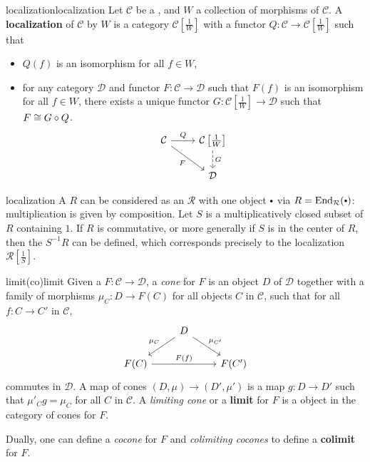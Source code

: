 \begin{topic}{localization}{localization}
    Let $\mathcal{C}$ be a , and $W$ a collection of morphisms of $\mathcal{C}$. A \textbf{localization} of $\mathcal{C}$ by $W$ is a category $\mathcal{C}\left[\frac{1}{W}\right]$ with a functor $Q \colon \mathcal{C} \to \mathcal{C}\left[\frac{1}{W}\right]$ such that
    \begin{itemize}
        \item $Q(f)$ is an isomorphism for all $f \in W$,
        \item for any category $\mathcal{D}$ and functor $F \colon \mathcal{C} \to \mathcal{D}$ such that $F(f)$ is an isomorphism for all $f \in W$, there exists a unique functor $G \colon \mathcal{C}\left[\frac{1}{W}\right] \to \mathcal{D}$ such that $F \cong G \circ Q$.
        \[ \svg \begin{tikzcd} \mathcal{C} \arrow{r}{Q} \arrow[swap]{rd}{F} & \mathcal{C}\left[\frac{1}{W}\right] \arrow[dashed]{d}{G} \\ & \mathcal{D} \end{tikzcd} \]
    \end{itemize}
\end{topic}

\begin{example}{localization}
    A  $R$ can be considered as an  $\mathcal{R}$ with one object $\bdot$ via $R = \textup{End}_\mathcal{R}(\bdot)$: multiplication is given by composition. Let $S$ is a multiplicatively closed subset of $R$ containing $1$. If $R$ is commutative, or more generally if $S$ is in the center of $R$, then the  $S^{-1} R$ can be defined, which corresponds precisely to the localization $\mathcal{R}\left[\frac{1}{S}\right]$.
\end{example}

\begin{topic}{limit}{(co)limit}
    Given a  $F \colon \mathcal{C} \to \mathcal{D}$, a \textit{cone} for $F$ is an object $D$ of $\mathcal{D}$ together with a family of morphisms $\mu_C \colon D \to F(C)$ for all objects $C$ in $\mathcal{C}$, such that for all $f \colon C \to C'$ in $\mathcal{C}$,
    \[ \svg \begin{tikzcd} & D \arrow[swap]{ld}{\mu_C} \arrow{rd}{\mu_{C'}} & \\ F(C) \arrow{rr}{F(f)} && F(C') \end{tikzcd} \]
    commutes in $\mathcal{D}$. A map of cones $(D, \mu) \to (D', \mu')$ is a map $g \colon D \to D'$ such that $\mu'_C g = \mu_C$ for all $C$ in $\mathcal{C}$. A \textit{limiting cone} or a \textbf{limit} for $F$ is a  object in the category of cones for $F$.
    
    Dually, one can define a \textit{cocone} for $F$ and \textit{colimiting cocones} to define a \textbf{colimit} for $F$.
\end{topic}

